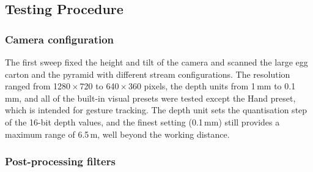 
\subsection{Testing Procedure}

\subsubsection{Camera configuration}

The first sweep fixed the height and tilt of the camera and scanned the large egg carton and the pyramid with different stream configurations. The resolution ranged from 1280\,$\times$\,720 to 640\,$\times$\,360 pixels, the depth units from 1\,mm to 0.1\,mm, and all of the built-in visual presets were tested except the Hand preset, which is intended for gesture tracking. The depth unit sets the quantisation step of the 16-bit depth values, and the finest setting (0.1\,mm) still provides a maximum range of 6.5\,m, well beyond the working distance. 


\subsubsection{Post-processing filters}

